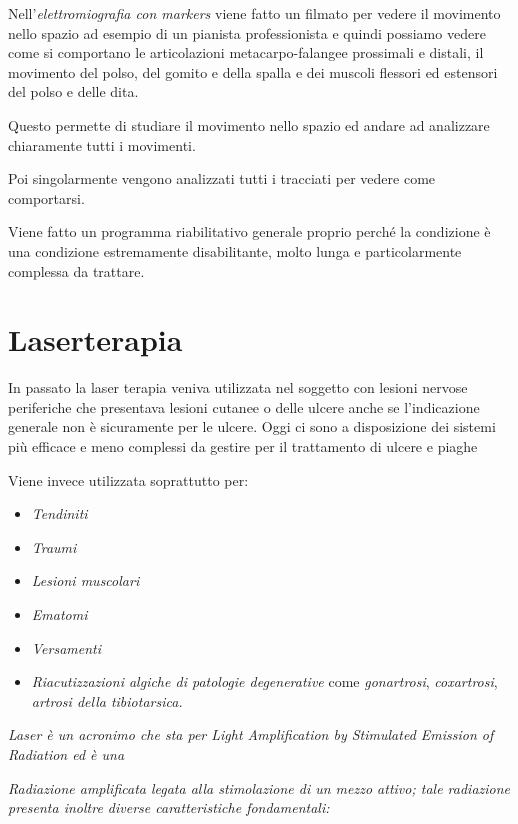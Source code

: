 Nell'\emph{elettromiografia con markers} viene fatto un filmato per
vedere il movimento nello spazio ad esempio di un pianista
professionista e quindi possiamo vedere come si comportano le
articolazioni metacarpo-falangee prossimali e distali, il movimento del
polso, del gomito e della spalla e dei muscoli flessori ed estensori del
polso e delle dita.

Questo permette di studiare il movimento nello spazio ed andare ad
analizzare chiaramente tutti i movimenti.

Poi singolarmente vengono analizzati tutti i tracciati per vedere come
comportarsi.

Viene fatto un programma riabilitativo generale proprio perché la
condizione è una condizione estremamente disabilitante, molto lunga e
particolarmente complessa da trattare.

\section{Laserterapia}

In passato la laser terapia veniva utilizzata nel soggetto con lesioni
nervose periferiche che presentava lesioni cutanee o delle ulcere anche
se l'indicazione generale non è sicuramente per le ulcere. Oggi ci sono
a disposizione dei sistemi più efficace e meno complessi da gestire per
il trattamento di ulcere e piaghe

Viene invece utilizzata soprattutto per:

\begin{itemize}
\item
  \emph{Tendiniti}
\item
  \emph{Traumi}
\item
  \emph{Lesioni muscolari}
\item
  \emph{Ematomi}
\item
  \emph{Versamenti}
\item
  \emph{Riacutizzazioni algiche di patologie degenerative} come
  \emph{gonartrosi}, \emph{coxartrosi}, \emph{artrosi della
  tibiotarsica.}
\end{itemize}

\emph{Laser è un acronimo che sta per Light Amplification by Stimulated
Emission of Radiation ed è una}

\emph{Radiazione amplificata legata alla stimolazione di un mezzo
attivo; tale radiazione presenta inoltre diverse caratteristiche
fondamentali: }

